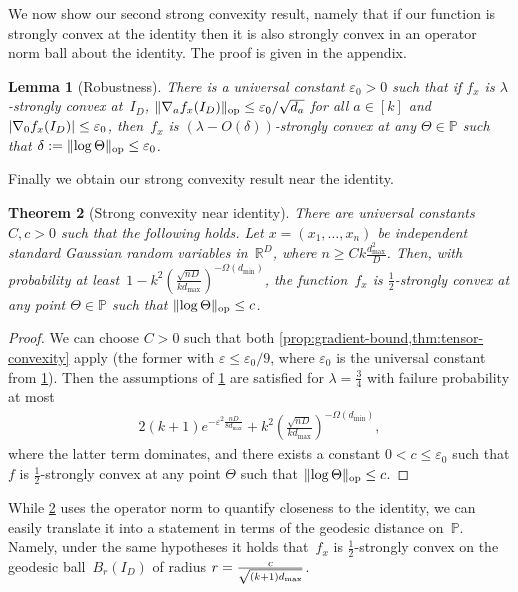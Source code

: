 \documentclass[aos]{imsart}
\newtheorem{theorem}{Theorem}[section]
\newtheorem{lemma}[theorem]{Lemma}
\theoremstyle{definition}
\numberwithin{equation}{section}
\DeclareMathOperator{\op}{op}
\DeclarePairedDelimiter{\abs}{\lvert}{\rvert}
\DeclarePairedDelimiter{\norm}{\lVert}{\rVert}
\newcommand{\R}{{\mathbb{R}}}
\renewcommand{\P}{{\mathbb{P}}}
\newcommand{\eps}{\varepsilon}
\newcommand{\samp}{x}
\begin{document}
We now show our second strong convexity result, namely that if our function is strongly convex at the identity then it is also strongly convex in an operator norm ball about the identity.
The proof is given in the appendix.

\begin{lemma}[Robustness]\label{convexRobustness}
There is a universal constant $\eps_0>0$ such that if $f_x$ is $\lambda$-strongly convex at~$I_D$, $\norm{\nabla_a f_x(I_D)}_{\op} \leq \eps_0/\sqrt{d_a}$ for all $a\in[k]$ and $\abs{\nabla_{0} f_{\samp}(I_{D})} \leq \eps_0$, then~$f_x$ is $(\lambda-O(\delta))$-strongly convex at any $\Theta\in\P$ such that $\delta := \norm{\log\Theta}_{\op} \leq \eps_0$.
\end{lemma}

Finally we obtain our strong convexity result near the identity.

\begin{theorem}[Strong convexity near identity]\label{thm:ball-convexity}
There are universal constants $C,c>0$ such that the following holds.
Let $x = (x_1,\dots,x_n)$ be independent standard Gaussian random variables in~$\R^D$, where $n \geq C k \frac{d_{\max}^2}D$.
Then, with probability at least~$1 - k^2 ( \frac{\sqrt{nD}}{k d_{\max}} )^{-\Omega(d_{\min})}$,
the function~$f_x$ is $\frac12$-strongly convex at any point $\Theta\in\P$ such that $\norm{\log\Theta}_{\op} \leq c$.
\end{theorem}
\begin{proof}
We can choose $C>0$ such that both \cref{prop:gradient-bound,thm:tensor-convexity} apply (the former with $\eps\leq\eps_0/9$, where $\eps_0$ is the universal constant from \cref{convexRobustness}).
Then the assumptions of \cref{convexRobustness} are satisfied for $\lambda=\frac34$ with failure probability at most
\begin{align*}
  2(k+1)e^{-\eps^2 \frac{nD}{8d_{\max}}} + k^2 \left( \frac{\sqrt{nD}}{k d_{\max}} \right)^{-\Omega(d_{\min})},
\end{align*}
where the latter term dominates, and there exists a constant $0<c\leq\eps_0$ such that $f$ is $\frac12$-strongly convex at any point $\Theta$ such that $\norm{\log\Theta}_{\op} \leq c$.
\end{proof}

While \cref{thm:ball-convexity} uses the operator norm to quantify closeness to the identity, we can easily translate it into a statement in terms of the geodesic distance on~$\P$.
Namely, under the same hypotheses it holds that~$f_x$ is $\frac12$-strongly convex on the geodesic ball~$B_r(I_D)$ of radius $r=\smash{\frac c{\sqrt{(k+1)d_{\max}}}}$.
\end{document}
